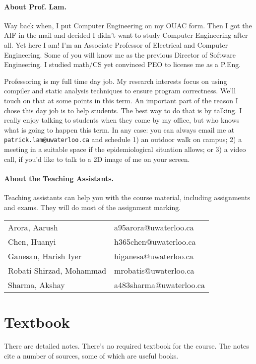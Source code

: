 \documentclass[letterpaper,10pt]{article}
\begin{document}
\paragraph{About Prof. Lam.}
Way back when, I put Computer Engineering on my OUAC form. Then I got the AIF in the mail and decided I didn't want to study Computer Engineering after all. Yet here I am! I'm an Associate Professor of Electrical and Computer Engineering. Some of you will know me as the previous Director of Software Engineering. I studied math/CS yet convinced PEO to license me as a P.Eng.

Professoring is my full time day job. My research interests focus on using compiler and static analysis techniques to ensure program correctness. We'll touch on that at some points in this term. An important part of the reason I chose this day job is to help students. The best way to do that is by talking. I really enjoy talking to students when they come by my office, but who knows what is going to happen this term. In any case: you can always email me at {\tt patrick.lam@uwaterloo.ca} and schedule 1) an outdoor walk on campus; 2) a meeting in a suitable space if the epidemiological situation allows; or 3) a video call, if you'd like to talk to a 2D image of me on your screen.

\paragraph{About the Teaching Assistants.}

Teaching assistants can help you with the course material, including assignments and exams. They will do most of the assignment marking.



\begin{center}
\begin{tabular} {l|l}
Arora, Aarush & a95arora@uwaterloo.ca \\
Chen, Huanyi  & h365chen@uwaterloo.ca \\
Ganesan, Harish Iyer & higanesa@uwaterloo.ca \\
Robati Shirzad, Mohammad & mrobatis@uwaterloo.ca \\
Sharma, Akshay & a483sharma@uwaterloo.ca \\
\end{tabular}
\end{center}



\section*{Textbook}
There are detailed notes. There's no required textbook for the course. The notes cite a number of sources, some of which are useful books.
\end{document}
